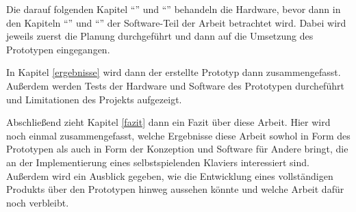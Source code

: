 Die darauf folgenden Kapitel \enquote{} und \enquote{} behandeln die Hardware, bevor dann in den Kapiteln \enquote{} und \enquote{} der Software-Teil der Arbeit betrachtet wird.
Dabei wird jeweils zuerst die Planung durchgeführt und dann auf die Umsetzung des Prototypen eingegangen.

In Kapitel \ref{ergebnisse} wird dann der erstellte Prototyp dann zusammengefasst.
Außerdem werden Tests der Hardware und Software des Prototypen durcheführt und Limitationen des Projekts aufgezeigt.

Abschließend zieht Kapitel \ref{fazit} dann ein Fazit über diese Arbeit.
Hier wird noch einmal zusammengefasst, welche Ergebnisse diese Arbeit sowhol in Form des Prototypen als auch in Form der Konzeption und Software für Andere bringt, die an der Implementierung eines selbstspielenden Klaviers interessiert sind.
Außerdem wird ein Ausblick gegeben, wie die Entwicklung eines vollständigen Produkts über den Prototypen hinweg aussehen könnte und welche Arbeit dafür noch verbleibt.
